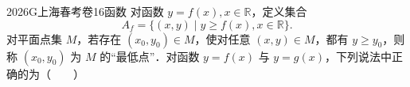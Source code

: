 
\begin{problem}{2026}{G}{上海春考卷}{16}{函数}
对函数 $y=f(x),x\in\mathbb{R}$，定义集合
$$
A_f=\{(x,y)\mid y\ge f(x),x\in\mathbb{R}\}.
$$
对平面点集 $M$，若存在 $(x_0,y_0)\in M$，使对任意 $(x,y)\in M$，都有 $y\ge y_0$，则称 $(x_0,y_0)$ 为 $M$ 的“最低点”．对函数 $y=f(x)$ 与 $y=g(x)$，下列说法中正确的为（　　）

\begin{choices}
\end{choices}
\end{problem}